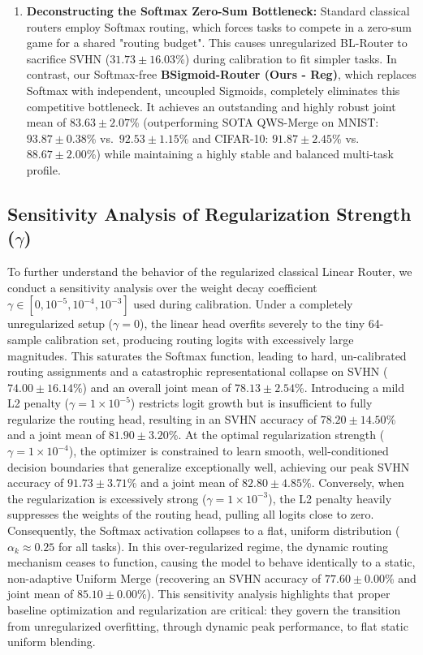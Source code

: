 \begin{enumerate}
    \item \textbf{Deconstructing the Softmax Zero-Sum Bottleneck:} Standard classical routers employ Softmax routing, which forces tasks to compete in a zero-sum game for a shared "routing budget". This causes unregularized BL-Router to sacrifice SVHN ($31.73 \pm 16.03$\%) during calibration to fit simpler tasks. In contrast, our Softmax-free \textbf{BSigmoid-Router (Ours - Reg)}, which replaces Softmax with independent, uncoupled Sigmoids, completely eliminates this competitive bottleneck. It achieves an outstanding and highly robust joint mean of $83.63 \pm 2.07$\% (outperforming SOTA QWS-Merge on MNIST: $93.87 \pm 0.38$\% vs.\ $92.53 \pm 1.15$\% and CIFAR-10: $91.87 \pm 2.45$\% vs.\ $88.67 \pm 2.00$\%) while maintaining a highly stable and balanced multi-task profile.
\end{enumerate}

\subsection{Sensitivity Analysis of Regularization Strength ($\gamma$)}
\label{sec:sensitivity}
To further understand the behavior of the regularized classical Linear Router, we conduct a sensitivity analysis over the weight decay coefficient $\gamma \in [0, 10^{-5}, 10^{-4}, 10^{-3}]$ used during calibration. 
Under a completely unregularized setup ($\gamma = 0$), the linear head overfits severely to the tiny 64-sample calibration set, producing routing logits with excessively large magnitudes. This saturates the Softmax function, leading to hard, un-calibrated routing assignments and a catastrophic representational collapse on SVHN ($74.00 \pm 16.14$\%) and an overall joint mean of $78.13 \pm 2.54$\%. 
Introducing a mild L2 penalty ($\gamma = 1\times 10^{-5}$) restricts logit growth but is insufficient to fully regularize the routing head, resulting in an SVHN accuracy of $78.20 \pm 14.50$\% and a joint mean of $81.90 \pm 3.20$\%. 
At the optimal regularization strength ($\gamma = 1\times 10^{-4}$), the optimizer is constrained to learn smooth, well-conditioned decision boundaries that generalize exceptionally well, achieving our peak SVHN accuracy of $91.73 \pm 3.71$\% and a joint mean of $82.80 \pm 4.85$\%. 
Conversely, when the regularization is excessively strong ($\gamma = 1\times 10^{-3}$), the L2 penalty heavily suppresses the weights of the routing head, pulling all logits close to zero. Consequently, the Softmax activation collapses to a flat, uniform distribution ($\alpha_k \approx 0.25$ for all tasks). In this over-regularized regime, the dynamic routing mechanism ceases to function, causing the model to behave identically to a static, non-adaptive Uniform Merge (recovering an SVHN accuracy of $77.60 \pm 0.00$\% and joint mean of $85.10 \pm 0.00$\%). This sensitivity analysis highlights that proper baseline optimization and regularization are critical: they govern the transition from unregularized overfitting, through dynamic peak performance, to flat static uniform blending.

